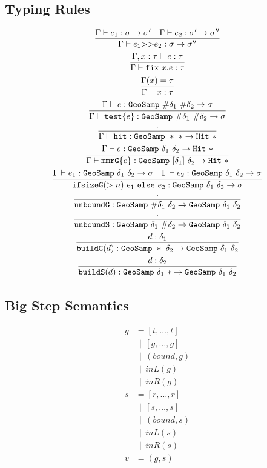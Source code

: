 \documentclass{article}
\newcommand {\gbar} {~~|~~}
\newcommand {\chain}{\mathtt{>>}}
\newcommand {\fix}{\mathtt{fix}}
\newcommand {\test}{\mathtt{test}}
\newcommand {\isect}{\mathtt{hit}}
\newcommand {\buildG}{\mathtt{buildG}}
\newcommand {\buildS}{\mathtt{buildS}}
\newcommand {\unboundG}{\mathtt{unboundG}}
\newcommand {\unboundS}{\mathtt{unboundS}}
\newcommand {\mmrG}{\mathtt{mmrG}}
\newcommand {\geosamp}{\mathtt{GeoSamp}}
\newcommand {\hit}{\mathtt{Hit}}
\newcommand {\inferenceSpacing}{\setlength{\jot}{3ex}}
\begin{document}
\subsection{Typing Rules}
\inferenceSpacing
\begin{gather}
\infer {\Gamma\vdash e_1 \chain e_2 : \sigma \to \sigma''}{\Gamma \vdash e_1 : \sigma\to \sigma' & \Gamma \vdash e_2 : \sigma' \to \sigma''} \\
\infer {\Gamma\vdash \fix~x.e : \tau}{\Gamma, x:\tau \vdash e : \tau} \\
\infer {\Gamma\vdash x : \tau}{\Gamma(x) = \tau} \\
\infer {\Gamma\vdash \test \{ e \} : \geosamp~\#\delta_1~\#\delta_2 \to \sigma}{\Gamma \vdash e : \geosamp~\#\delta_1~\#\delta_2  \to \sigma} \\
\infer {\Gamma \vdash \isect : \geosamp~\ast~\ast \to \hit~\ast} {\cdot} \\
\infer {\Gamma \vdash \mmrG \{ e \} : \geosamp~[\delta_1]~\delta_2 \to \hit~\ast} {\Gamma \vdash e : \geosamp~\delta_1~\delta_2 \to \hit~\ast }\\
\infer {\mathtt{ifsizeG}(>n)~e_1 \mathtt{~else~} e_2 : \geosamp~\delta_1~\delta_2 \to \sigma} {\Gamma \vdash e_1 : \geosamp~\delta_1~\delta_2 \to \sigma & \Gamma \vdash e_2 : \geosamp~\delta_1~\delta_2 \to \sigma} \\
\infer { \unboundG : \geosamp~\#\delta_1~\delta_2 \to \geosamp~\delta_1~\delta_2} {\cdot}\\
\infer { \unboundS : \geosamp~\delta_1~\#\delta_2 \to \geosamp~\delta_1~\delta_2} {\cdot}\\
\infer { \buildG (d): \geosamp~\ast~\delta_2 \to \geosamp~\delta_1~\delta_2} {d : \delta_1}\\
\infer { \buildS (d): \geosamp~\delta_1~\ast \to \geosamp~\delta_1~\delta_2} {d : \delta_2}
\end{gather}

\subsection {Big Step Semantics}
\begin{align*}
g &= [t, \ldots, t] \\
&\gbar [g, \ldots, g]\\
&\gbar (bound, g)\\
&\gbar inL (g)\\
&\gbar inR (g)\\
s &= [r, \ldots, r] \\
&\gbar [s, \ldots, s]\\
&\gbar (bound, s)\\
&\gbar inL (s)\\
&\gbar inR (s)\\
v &= (g,s) 
\end{align*}
\end{document}

